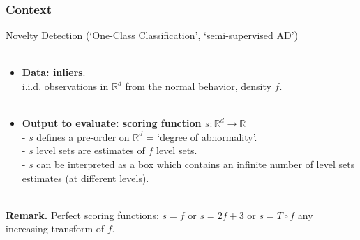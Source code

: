 \documentclass[10pt]{beamer}
\newcommand\red{\color{red} }
\newcommand\blue{\color{blue} }
\begin{document}
\begin{frame}
\frametitle{Context}

\begin{block}{Novelty Detection { \footnotesize (`One-Class Classification', `semi-supervised AD')}}~\\~\\

\begin{itemize}
\item \textbf{Data: {\red inliers}}.\\
i.i.d. observations in $\mathbb{R}^d$ from the normal behavior, density {\red $f$}.\\~\\

\item \textbf{Output to evaluate: {\blue scoring function $s: \mathbb{R}^d \to \mathbb{R}$}} \\
- $s$ defines a {\blue pre-order} on $\mathbb{R}^d$ = `degree of abnormality'.\\
- $s$ level sets are estimates of $f$ level sets.\\
- $s$ can be interpreted as a box which contains {\blue an infinite number of level sets estimates} (at different levels).\\~\\
\end{itemize}

\textbf{Remark.} Perfect scoring functions: $s=f$ or $s=2f+3$ or $s=T \circ f$ any increasing transform of $f$. \\

\end{block}
\end{frame}
\end{document}
